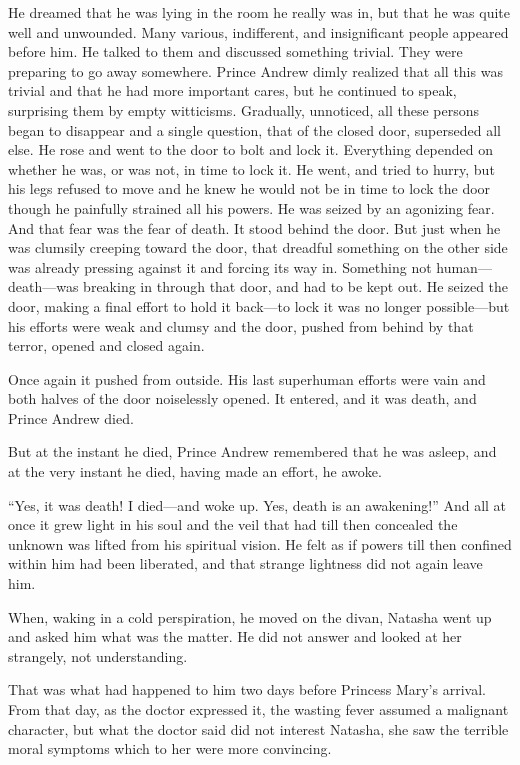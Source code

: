 He dreamed that he was lying in the room he really was in, but
that he was quite well and unwounded. Many various, indifferent,
and insignificant people appeared before him. He talked to them
and discussed something trivial. They were preparing to go away
somewhere.  Prince Andrew dimly realized that all this was
trivial and that he had more important cares, but he continued to
speak, surprising them by empty witticisms. Gradually, unnoticed,
all these persons began to disappear and a single question, that
of the closed door, superseded all else. He rose and went to the
door to bolt and lock it. Everything depended on whether he was,
or was not, in time to lock it. He went, and tried to hurry, but
his legs refused to move and he knew he would not be in time to
lock the door though he painfully strained all his powers. He was
seized by an agonizing fear. And that fear was the fear of
death. It stood behind the door. But just when he was clumsily
creeping toward the door, that dreadful something on the other
side was already pressing against it and forcing its way
in. Something not human---death---was breaking in through that
door, and had to be kept out. He seized the door, making a final
effort to hold it back---to lock it was no longer possible---but
his efforts were weak and clumsy and the door, pushed from behind
by that terror, opened and closed again.

Once again it pushed from outside. His last superhuman efforts
were vain and both halves of the door noiselessly opened. It
entered, and it was death, and Prince Andrew died.

But at the instant he died, Prince Andrew remembered that he was
asleep, and at the very instant he died, having made an effort,
he awoke.

``Yes, it was death! I died---and woke up. Yes, death is an
awakening!''  And all at once it grew light in his soul and the
veil that had till then concealed the unknown was lifted from his
spiritual vision. He felt as if powers till then confined within
him had been liberated, and that strange lightness did not again
leave him.

When, waking in a cold perspiration, he moved on the divan,
Natasha went up and asked him what was the matter. He did not
answer and looked at her strangely, not understanding.

That was what had happened to him two days before Princess Mary's
arrival. From that day, as the doctor expressed it, the wasting
fever assumed a malignant character, but what the doctor said did
not interest Natasha, she saw the terrible moral symptoms which
to her were more convincing.

